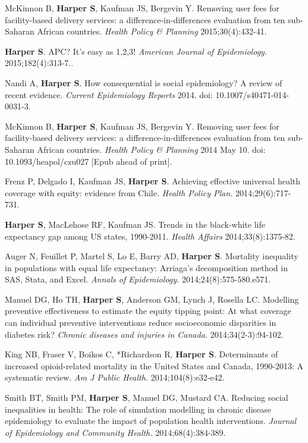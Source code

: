 \documentclass[
  letterpaper,
  DIV=11,
  numbers=noendperiod]{scrartcl}
\begin{document}
McKinnon B, \textbf{Harper S}, Kaufman JS, Bergevin Y. Removing user
fees for facility-based delivery services: a difference-in-differences
evaluation from ten sub-Saharan African countries. \emph{Health Policy
\& Planning} 2015;30(4):432-41.

\textbf{Harper S}. APC? It's easy as 1,2,3! \emph{American Journal of
Epidemiology.} 2015;182(4):313-7..

Nandi A, \textbf{Harper S}. How consequential is social epidemiology? A
review of recent evidence. \emph{Current Epidemiology Reports} 2014.
doi: 10.1007/s40471-014-0031-3.

McKinnon B, \textbf{Harper S}, Kaufman JS, Bergevin Y. Removing user
fees for facility-based delivery services: a difference-in-differences
evaluation from ten sub-Saharan African countries. \emph{Health Policy
\& Planning} 2014 May 10. doi: 10.1093/heapol/czu027 {[}Epub ahead of
print{]}.

Frenz P, Delgado I, Kaufman JS, \textbf{Harper S}. Achieving effective
universal health coverage with equity: evidence from Chile. \emph{Health
Policy Plan.} 2014;29(6):717-731.

\textbf{Harper S}, MacLehose RF, Kaufman JS. Trends in the black-white
life expectancy gap among US states, 1990-2011. \emph{Health Affairs}
2014;33(8):1375-82.

Auger N, Feuillet P, Martel S, Lo E, Barry AD, \textbf{Harper S}.
Mortality inequality in populations with equal life expectancy:
Arriaga's decomposition method in SAS, Stata, and Excel. \emph{Annals of
Epidemiology.} 2014;24(8):575-580.e571.

Manuel DG, Ho TH, \textbf{Harper S}, Anderson GM, Lynch J, Rosella LC.
Modelling preventive effectiveness to estimate the equity tipping point:
At what coverage can individual preventive interventions reduce
socioeconomic disparities in diabetes risk? \emph{Chronic diseases and
injuries in Canada.} 2014;34(2-3):94-102.

King NB, Fraser V, Boikos C, *Richardson R, \textbf{Harper S}.
Determinants of increased opioid-related mortality in the United States
and Canada, 1990-2013: A systematic review. \emph{Am J Public Health.}
2014;104(8):e32-e42.

Smith BT, Smith PM, \textbf{Harper S}, Manuel DG, Mustard CA. Reducing
social inequalities in health: The role of simulation modelling in
chronic disease epidemiology to evaluate the impact of population health
interventions. \emph{Journal of Epidemiology and Community Health.}
2014;68(4):384-389.
\end{document}
